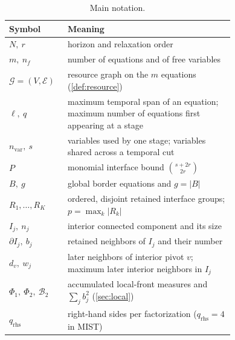 \begin{table}[htbp]
\centering
\caption{Main notation.}\label{tab:notation}
\small
\begin{tabular}{@{}lp{0.74\linewidth}@{}}
\toprule
Symbol & Meaning\\
\midrule
$N,\ r$ & horizon and relaxation order\\
$m,\ n_f$ & number of equations and of free variables\\
$\mathcal G=(V,\mathcal E)$ & resource graph on the $m$ equations (\cref{def:resource})\\
$\ell,\ q$ & maximum temporal span of an equation; maximum number of equations first appearing at a stage\\
$n_{\mathrm{var}},\ s$ & variables used by one stage; variables shared across a temporal cut\\
$P$ & monomial interface bound $\binom{s+2r}{2r}$\\
$B,\ g$ & global border equations and $g=|B|$\\
$R_1,\ldots,R_K$ & ordered, disjoint retained interface groups; $p=\max_k|R_k|$\\
$I_j,\ n_j$ & interior connected component and its size\\
$\partial I_j,\ b_j$ & retained neighbors of $I_j$ and their number\\
$d_v,\ w_j$ & later neighbors of interior pivot $v$; maximum later interior neighbors in $I_j$\\
$\Phi_1,\ \Phi_2,\ \mathcal B_2$ & accumulated local-front measures and $\sum_jb_j^2$ (\cref{sec:local})\\
$q_{\mathrm{rhs}}$ & right-hand sides per factorization ($q_{\mathrm{rhs}}=4$ in MIST)\\
\bottomrule
\end{tabular}
\end{table}
